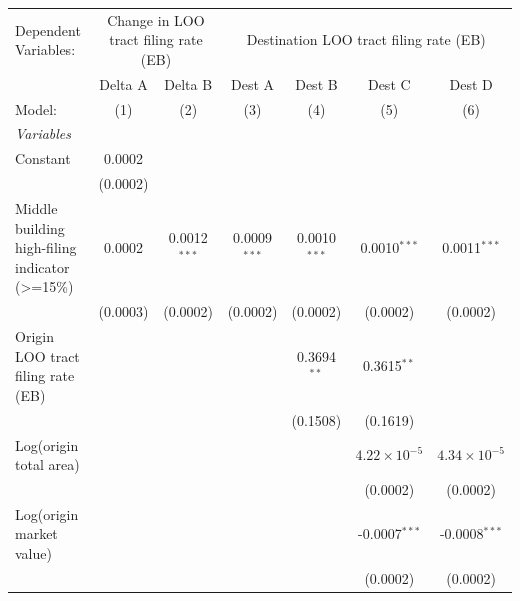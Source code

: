 \begingroup
\centering
\begin{tabular}{lcccccc}
   \tabularnewline \midrule \midrule
   Dependent Variables: & \multicolumn{2}{c}{Change in LOO tract filing rate (EB)} & \multicolumn{4}{c}{Destination LOO tract filing rate (EB)}\\
                                                   & Delta A  & Delta B        & Dest A         & Dest B         & Dest C                & Dest D \\   
   Model:                                          & (1)      & (2)            & (3)            & (4)            & (5)                   & (6)\\  
   \midrule
   \emph{Variables}\\
   Constant                                        & 0.0002   &                &                &                &                       &   \\   
                                                   & (0.0002) &                &                &                &                       &   \\   
   Middle building high-filing indicator (>=15\%)  & 0.0002   & 0.0012$^{***}$ & 0.0009$^{***}$ & 0.0010$^{***}$ & 0.0010$^{***}$        & 0.0011$^{***}$\\   
                                                   & (0.0003) & (0.0002)       & (0.0002)       & (0.0002)       & (0.0002)              & (0.0002)\\   
   Origin LOO tract filing rate (EB)               &          &                &                & 0.3694$^{**}$  & 0.3615$^{**}$         &   \\   
                                                   &          &                &                & (0.1508)       & (0.1619)              &   \\   
   Log(origin total area)                          &          &                &                &                & $4.22\times 10^{-5}$  & $4.34\times 10^{-5}$\\    
                                                   &          &                &                &                & (0.0002)              & (0.0002)\\   
   Log(origin market value)                        &          &                &                &                & -0.0007$^{***}$       & -0.0008$^{***}$\\   
                                                   &          &                &                &                & (0.0002)              & (0.0002)\\   

\end{tabular}
